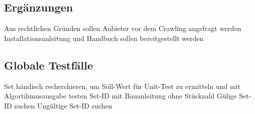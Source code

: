 \subsection{Ergänzungen}
Aus rechtlichen Gründen sollen Anbieter vor dem Crawling angefragt werden \newline
Installationsanleitung und Handbuch sollen bereitgestellt werden \newline

\subsection{Globale Testfälle}
Set händisch recherchieren, um Soll-Wert für Unit-Test zu ermitteln und mit Algortihmusausgabe testen \newline
Set-ID mit Bauanleitung ohne Stückzahl \newline
Gülige Set-ID suchen \newline
Ungültige Set-ID suchen \newline
